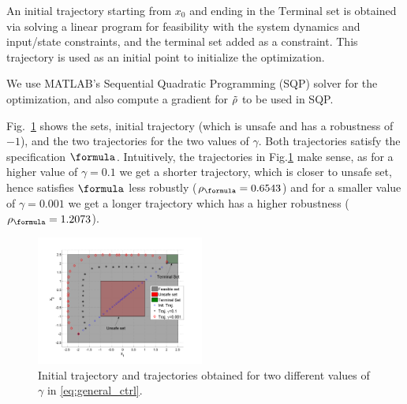 An initial trajectory starting from $x_0$ and ending in the $\text{Terminal}$ set is obtained via solving a linear program for feasibility with the system dynamics and input/state constraints, and the terminal set added as a constraint. This trajectory is used as an initial point to initialize the optimization.

We use MATLAB's Sequential Quadratic Programming (SQP) solver for the optimization, and also compute a gradient for $\tilde{\rho}$ to be used in SQP.


Fig.~\ref{fig:toy control} shows the sets, initial trajectory (which is unsafe and has a robustness of $-1$), and the two trajectories for the two values of $\gamma$. Both trajectories satisfy the specification $\formula$. Intuitively, the trajectories in Fig.\ref{fig:toy control} make sense, as for a higher value of $\gamma=0.1$ we get a shorter trajectory, which is closer to unsafe set, hence satisfies $\formula$ less robustly ($\rob_{\formula}=0.6543$) and for a smaller value of $\gamma=0.001$ we get a longer trajectory which has a higher robustness ($\rob_{\formula}=1.2073$).

\begin{figure}[t]
\centering
\includegraphics[width=0.49\textwidth]{figures/ToyExampleControl}
\vspace{-30pt}
\caption{{\small Initial trajectory and trajectories obtained for two different values of $\gamma$ in \eqref{eq:general_ctrl}.}}
\label{fig:toy control}
\vspace{-10pt}
\end{figure}